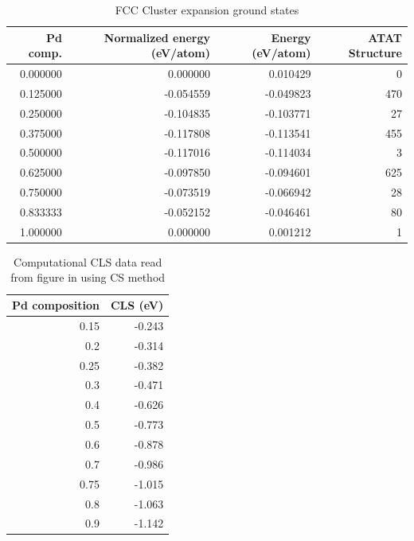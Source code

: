 \documentclass[number, sort&compress, review, 12pt]{elsarticle}
\begin{document}
\begin{table}[H]
\caption{\label{fcc}FCC Cluster expansion ground states}
\centering
\begin{tabular}{rrrr}
Pd comp. & Normalized energy (eV/atom) & Energy (eV/atom) & ATAT Structure\\
\hline
0.000000 & 0.000000 & 0.010429 & 0\\
0.125000 & -0.054559 & -0.049823 & 470\\
0.250000 & -0.104835 & -0.103771 & 27\\
0.375000 & -0.117808 & -0.113541 & 455\\
0.500000 & -0.117016 & -0.114034 & 3\\
0.625000 & -0.097850 & -0.094601 & 625\\
0.750000 & -0.073519 & -0.066942 & 28\\
0.833333 & -0.052152 & -0.046461 & 80\\
1.000000 & 0.000000 & 0.001212 & 1\\
\end{tabular}
\end{table}

\begin{table}[H]
\caption{\label{cs-method}Computational CLS data read from figure in \cite{olovsson-2002-core-level} using CS method}
\centering
\begin{tabular}{rr}
Pd composition & CLS (eV)\\
\hline
0.15 & -0.243\\
0.2 & -0.314\\
0.25 & -0.382\\
0.3 & -0.471\\
0.4 & -0.626\\
0.5 & -0.773\\
0.6 & -0.878\\
0.7 & -0.986\\
0.75 & -1.015\\
0.8 & -1.063\\
0.9 & -1.142\\
\end{tabular}
\end{table}
\end{document}
